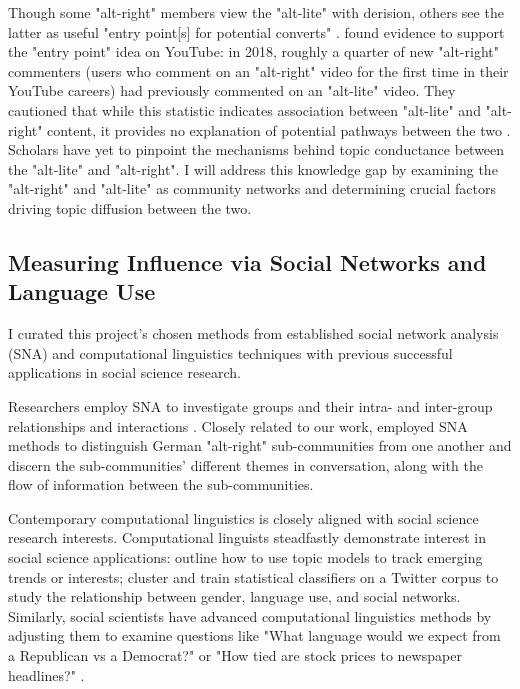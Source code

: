\documentclass[acmlarge, screen, authorversion]{acmart}
\begin{document}
Though some "alt-right" members view the "alt-lite" with derision,
others see the latter as useful "entry point[s] for potential converts"
\cite{hartEntryistsEntryPoint2016}. \citet{ribeiroAuditingRadicalizationPathways2019} found evidence to support
the "entry point" idea on YouTube: in 2018, roughly a
quarter of new "alt-right" commenters (users who comment on an
"alt-right" video for the first time in their YouTube careers) had
previously commented on an "alt-lite" video. They cautioned that while
this statistic indicates association between "alt-lite" and "alt-right" content,
it provides no explanation of potential pathways between the two 
\cite{ribeiroAuditingRadicalizationPathways2019}. Scholars have yet to pinpoint 
the mechanisms behind topic conductance between the "alt-lite" 
and "alt-right".
I will address this knowledge gap by examining the "alt-right" and "alt-lite" as
community networks and determining crucial factors driving topic
diffusion between the two.

\subsection{Measuring Influence via Social Networks and Language Use}

I curated this project's chosen methods from established social network analysis
(SNA) and computational linguistics techniques with previous successful
applications in social science research.

Researchers employ SNA to investigate groups and their intra- and inter-group
relationships and interactions \cite{carringtonModelsMethodsSocial2005}. Closely
related to our work, \citet{morstatterAltRightAltRechtsTwitter2018} employed SNA
methods to distinguish German "alt-right" sub-communities from one another and
discern the sub-communities' different themes in conversation, along with the
flow of information between the sub-communities.

Contemporary computational linguistics is closely aligned with social science
research interests. Computational linguists steadfastly demonstrate interest in
social science applications: \citep{lauOnlineTrendAnalysis} outline how to use
topic models to track emerging trends or interests;
\cite{bammanGenderIdentityLexical2014} cluster and train statistical classifiers
on a Twitter corpus to study the relationship between gender, language use, and
social networks. Similarly, social scientists have advanced computational
linguistics methods by adjusting them to examine questions like "What language
would we expect from a Republican vs a Democrat?" or "How tied are stock prices
to newspaper headlines?"  \cite{monroeFightinWordsLexical2008,
gentzkowTextData2019}.
\end{document}
